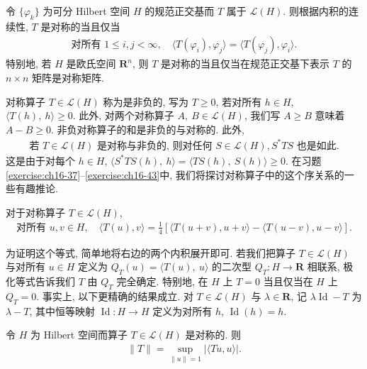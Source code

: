 \documentclass[../../main.tex]{subfiles}
\begin{document}
\begin{example}\label{example:ch16-symmetric-matrix}
令 $\{\varphi_{k}\}$ 为可分 Hilbert 空间 $H$ 的规范正交基而 $T$ 属于 $\mathcal{L}(H)$. 则根据内积的连续性, $T$ 是对称的当且仅当
\begin{align*}
\text{对所有 }1\leqslant i,j<\infty,\quad\langle T(\varphi_{i}),\varphi_{j}\rangle=\langle T(\varphi_{j}),\varphi_{i}\rangle.
\end{align*}
特别地, 若 $H$ 是欧氏空间 $\mathbf{R}^{n}$, 则 $T$ 是对称的当且仅当在规范正交基下表示 $T$ 的 $n\times n$ 矩阵是对称矩阵.
\end{example}

对称算子 $T\in\mathcal{L}(H)$ 称为是非负的, 写为 $T\geqslant 0$, 若对所有 $h\in H$, $\langle T(h),\ h\rangle\geqslant 0$. 此外, 对两个对称算子 $A,\ B\in\mathcal{L}(H)$, 我们写 $A\geqslant B$ 意味着 $A-B\geqslant 0$. 非负对称算子的和是非负的与对称的. 此外,
\begin{align}
\text{若 }T\in\mathcal{L}(H)\text{ 是对称与非负的, 则对任何 }S\in\mathcal{L}(H),S^{*}TS\text{ 也是如此}.\label{align:ch16-nonneg-star}
\end{align}
这是由于对每个 $h\in H$, $\langle S^{*}TS(h),\ h\rangle=\langle TS(h),\ S(h)\rangle\geqslant 0$. 在习题\cref{exercise:ch16-37}--\cref{exercise:ch16-43}中, 我们将探讨对称算子中的这个序关系的一些有趣推论.

\begin{theorem}[极化等式]\label{theorem:ch16-polarization}
对于对称算子 $T\in\mathcal{L}(H)$,
\begin{align}
\text{对所有 }u,v\in H,\quad\langle T(u),v\rangle=\frac{1}{4}[\langle T(u+v),u+v\rangle-\langle T(u-v),u-v\rangle].\label{align:ch16-polarization}
\end{align}
\end{theorem}

为证明这个等式, 简单地将右边的两个内积展开即可. 若我们把算子 $T\in\mathcal{L}(H)$ 与对所有 $u\in H$ 定义为 $Q_{T}(u)=\langle T(u),\ u\rangle$ 的二次型 $Q_{T}:H\to\mathbf{R}$ 相联系, 极化等式告诉我们 $T$ 由 $Q_{T}$ 完全确定. 特别地, 在 $H$ 上 $T=0$ 当且仅当在 $H$ 上 $Q_{T}=0$. 事实上, 以下更精确的结果成立. 对 $T\in\mathcal{L}(H)$ 与 $\lambda\in\mathbf{R}$, 记 $\lambda\operatorname{Id}-T$ 为 $\lambda-T$, 其中恒等映射 $\operatorname{Id}:H\to H$ 定义为对所有 $h$, $\operatorname{Id}(h)=h$.

\begin{proposition}\label{proposition:ch16-norm-form}
令 $H$ 为 Hilbert 空间而算子 $T\in\mathcal{L}(H)$ 是对称的. 则
\begin{align}
\|T\|=\sup_{\|u\|=1}|\langle Tu,u\rangle|.\label{align:ch16-norm-form}
\end{align}
\end{proposition}
\end{document}
